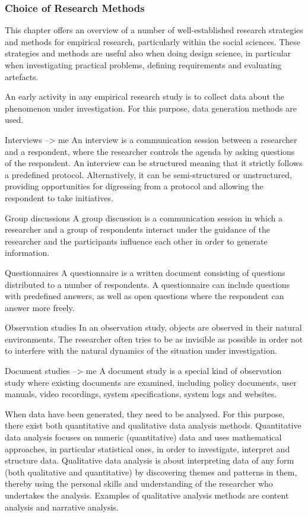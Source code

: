 \subsubsection{Choice of Research Methods}

This chapter offers an overview
of a number of well-established research strategies and methods for
empirical research, particularly within the social sciences. These
strategies and methods are useful also when doing design science, in
particular when investigating practical problems, defining requirements
and evaluating artefacts.

An early activity in any empirical research study is to collect data
about the phenomenon under investigation. For this purpose, data
generation methods are used.


Interviews --> me
An interview is a communication session between a researcher and a
respondent, where the researcher controls the agenda by asking
questions of the respondent. An interview can be structured meaning
that it strictly follows a predefined protocol. Alternatively, it can
be semi-structured or unstructured, providing opportunities for digressing
from a protocol and allowing the respondent to take initiatives.

Group discussions
A group discussion is a communication session in which a researcher
and a group of respondents interact under the guidance of the researcher
and the participants influence each other in order to generate
information.

Questionnaires
A questionnaire is a written document consisting of questions distributed
to a number of respondents. A questionnaire can include
questions with predefined answers, as well as open questions where
the respondent can answer more freely.

Observation studies
In an observation study, objects are observed in their natural environments.
The researcher often tries to be as invisible as possible in
order not to interfere with the natural dynamics of the situation under
investigation.

Document studies --> me
A document study is a special kind of observation study where existing
documents are examined, including policy documents, user manuals,
video recordings, system specifications, system logs and websites.

When data have been generated, they need to be analysed. For this
purpose, there exist both quantitative and qualitative data analysis
methods. Quantitative data analysis focuses on numeric (quantitative)
data and uses mathematical approaches, in particular statistical
ones, in order to investigate, interpret and structure data. Qualitative
data analysis is about interpreting data of any form (both qualitative
and quantitative) by discovering themes and patterns in them,
thereby using the personal skills and understanding of the researcher
who undertakes the analysis. Examples of qualitative analysis
methods are content analysis and narrative analysis.



